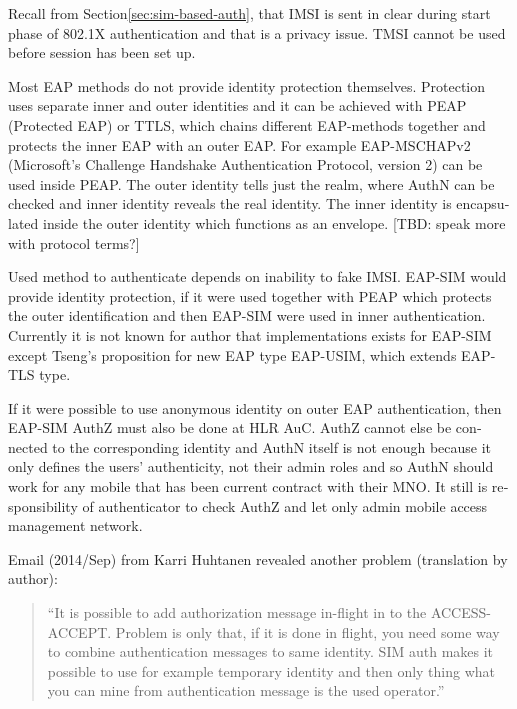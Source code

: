 \documentclass[12pt,a4paper,english]{tutthesis}
\begin{document}
\begin{otherlanguage}{english}
Recall from Section\ref{sec:sim-based-auth}, that IMSI is sent in clear 
during start phase of 802.1X authentication and that is a privacy 
issue. TMSI cannot be used before session has been set up. \cite[p.66]{rfc4186}


Most EAP methods do not provide identity protection themselves. Protection
uses separate  inner and outer identities and it can be achieved with
PEAP (Protected  EAP) or TTLS, which chains different EAP-methods together and
protects the inner EAP with an outer EAP. For example 
EAP-MSCHAPv2 (Microsoft's Challenge Handshake Authentication Protocol,
version 2) can be used inside PEAP.
The outer identity tells just the realm, where AuthN can be checked
 and inner identity reveals the real identity.
The inner identity is encapsulated inside the outer identity which
functions as an envelope. [TBD: speak more with protocol terms?]


Used method to authenticate depends on inability to fake IMSI.
EAP-SIM would provide identity protection, if it were used together
with PEAP which protects the outer identification  and
then EAP-SIM were used in inner authentication.
Currently it is not known for author that implementations exists for
EAP-SIM  except Tseng's proposition \cite{tseng-usim} for  new EAP type
EAP-USIM, which extends EAP-TLS type.

If it were possible to use anonymous identity on outer EAP
authentication, then EAP-SIM AuthZ must also be done at HLR AuC.
AuthZ cannot else be connected to the corresponding
identity and AuthN itself is not enough because it only defines the users'
authenticity, not their admin roles and so 
AuthN should work for any mobile that has been current contract with
their MNO. 
It still is responsibility of authenticator to 
check AuthZ  and let only admin mobile access management network.








Email (2014/Sep) from Karri Huhtanen revealed another
problem (translation by author):
\begin{quote}
``It is possible to add authorization message in-flight in to the
ACCESS-ACCEPT.
Problem is only that, if it is done in flight, you need some way to
combine authentication messages to same identity. SIM auth makes it
possible to use for example temporary identity and then only thing
what you can mine from authentication message is the used operator.''
\end{quote}


\end{otherlanguage}
\end{document}

